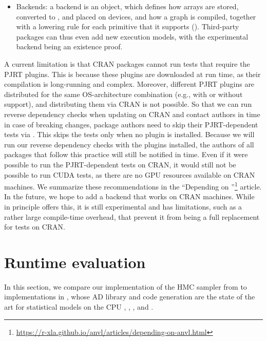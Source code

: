 \documentclass[article,shortnames]{jss}
\begin{document}
\begin{itemize}
      We are excited to see what this can enable.
      We refer to the ``Internals''\footnote{\url{https://r-xla.github.io/anvl/articles/internals.html}} article for more details.
\item Backends: a backend is an  object, which defines how arrays are stored, converted to , and placed on devices, and how a graph is compiled, together with a lowering rule for each primitive that it supports ().
      Third-party packages can thus even add new execution models, with the experimental  backend being an existence proof.
\end{itemize}

A current limitation is that CRAN packages cannot run tests that require the PJRT plugins.
This is because these plugins are downloaded at run time, as their compilation is long-running and complex.
Moreover, different PJRT plugins are distributed for the same OS-architecture combination (e.g., with or without  support), and distributing them via CRAN is not possible.
So that we can run reverse dependency checks when updating  on CRAN and contact authors in time in case of breaking changes, package authors need to skip their PJRT-dependent tests via .
This skips the tests only when no plugin is installed.
Because we will run our reverse dependency checks with the plugins installed, the authors of all packages that follow this practice will still be notified in time.
Even if it were possible to run the PJRT-dependent tests on CRAN, it would still not be possible to run CUDA tests, as there are no GPU resources available on CRAN machines.
We summarize these recommendations in the ``Depending on ''\footnote{\url{https://r-xla.github.io/anvl/articles/depending-on-anvl.html}} article.
In the future, we hope to add a backend that works on CRAN machines.
While  in principle offers this, it is still experimental and has limitations, such as a rather large compile-time overhead, that prevent it from being a full replacement for tests on CRAN.

\section{Runtime evaluation}\label{runtime}

In this section, we compare our  implementation of the HMC sampler from  to implementations in , whose AD library and code generation are the state of the art for statistical models on the CPU \citep{ref-stanmath}, , , and .
\end{document}

